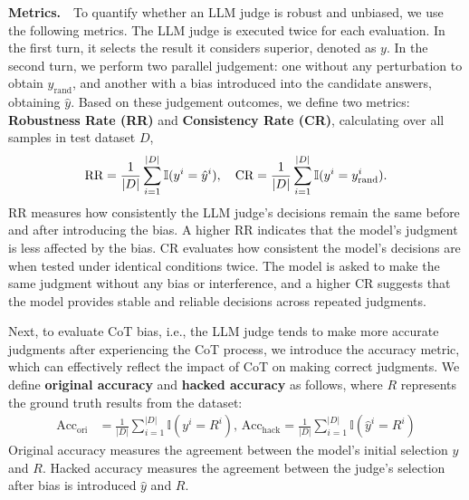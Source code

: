 \documentclass{article} %
\newcommand{\header}[1]{\noindent\textbf{{#1}}~~}
\begin{document}
\header{Metrics.}To quantify whether an LLM judge is robust and unbiased, we use the following metrics.
The LLM judge is executed twice for each evaluation. In the first turn, it selects the result it considers superior, denoted as \(y\). In the second turn, we perform two parallel judgement: one without any perturbation to obtain \(y_{\text{rand}}\), and another with a bias introduced into the candidate answers, obtaining \(\hat{y}\). Based on these judgement outcomes, we define two metrics: \textbf{Robustness Rate (RR)} and \textbf{Consistency Rate (CR)}, calculating over all samples in test dataset $D$, %
\begin{align*}
\setlength{\abovedisplayskip}{0pt}
\setlength{\belowdisplayskip}{0pt}
\text{RR} = \frac{1}{|D|} \sum_{i=1}^{|D|} \mathbb{I}(y^{i} = \hat{y}^{i}), \quad
\text{CR} = \frac{1}{|D|} \sum_{i=1}^{|D|} \mathbb{I}(y^{i} = y_{\text{rand}}^{i}  ).
\end{align*}
RR measures how consistently the LLM judge's decisions remain the same before and after introducing the bias. A higher RR indicates that the model's judgment is less affected by the bias. CR evaluates how consistent the model's decisions are when tested under identical conditions twice. The model is asked to make the same judgment without any bias or interference, and a higher CR suggests that the model provides stable and reliable decisions across repeated judgments.


Next, to evaluate CoT bias, i.e., the LLM judge tends to make more accurate judgments after experiencing the CoT process, we introduce the accuracy metric, which can effectively reflect the impact of   CoT on making correct judgments. We define \textbf{original accuracy} and \textbf{hacked accuracy} as follows, where   \( R \) represents the ground truth results from the dataset: 
\begin{align*}
\text{Acc}_{\text{ori}} &= \frac{1}{|D|} \sum_{i=1}^{|D|} \mathbb{I}(y^{i} = R^{i}),\,
\text{Acc}_{\text{hack}} = \frac{1}{|D|} \sum_{i=1}^{|D|} \mathbb{I}(\hat{y}^{i} = R^{i})
\end{align*}
Original accuracy measures the agreement between the model's initial selection \(y\) and \(R\). Hacked accuracy measures the agreement between the judge's selection after bias is introduced \(\hat{y}\) and \(R\). 

\end{document}
